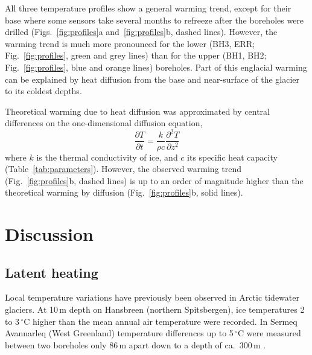 \documentclass[utf8]{article}
\begin{document}
    All three temperature profiles show a general warming trend, except for
    their base where some sensors take several months to refreeze after the
    boreholes were drilled (Figs.~\ref{fig:profiles}a and~\ref{fig:profiles}b,
    dashed lines). However, the warming trend is much more pronounced for the
    lower (BH3, ERR; Fig.~\ref{fig:profiles}, green and grey lines) than for
    the upper (BH1, BH2; Fig.~\ref{fig:profiles}, blue and orange lines)
    boreholes. Part of this
    englacial warming can be explained by heat diffusion from the base and
    near-surface of the glacier to its coldest depths.

    Theoretical warming due to heat diffusion was approximated by central
    differences on the one-dimensional diffusion equation,
    \begin{equation}
      \frac{\partial T}{\partial t} =
        \frac{k}{\rho c} \frac{\partial^2 T}{\partial z^2}
    \end{equation}
    where $k$ is the thermal conductivity of ice, and $c$ its specific heat
    capacity (Table~\ref{tab:parameters}). However, the observed warming trend
    (Fig.~\ref{fig:profiles}b,
    dashed lines) is up to an order of magnitude higher than the theoretical
    warming by diffusion (Fig.~\ref{fig:profiles}b, solid lines).


\section{Discussion}

\subsection{Latent heating}

    Local temperature variations have previously been observed in Arctic
    tidewater glaciers. At 10\,m depth on Hansbreen (northern Spitsbergen),
    ice temperatures 2 to 3\,$^\circ$C higher than the mean annual air
    temperature \citep{Jania.etal.1996} were recorded. In Sermeq Avannarleq
    (West Greenland)
    temperature differences up to 5\,$^\circ$C were measured between two
    boreholes only 86\,m apart down to a depth of ca.~300\,m
    \citep{Luthi.etal.2015}.
\end{document}
